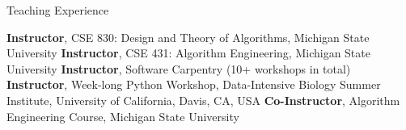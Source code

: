 \begin{rubric}{Teaching Experience}

\entry*[2021] \textbf{Instructor}, CSE 830: Design and Theory of Algorithms, Michigan State University
%
\entry*[2020] \textbf{Instructor}, CSE 431: Algorithm Engineering, Michigan State University
%
\entry*[2015 -- Present] \textbf{Instructor}, Software Carpentry (10+ workshops in total)
%
\entry*[Summer 2017] \textbf{Instructor}, Week-long Python Workshop, Data-Intensive Biology Summer Institute, University of California, Davis, CA, USA
%
\entry*[Spring 2016] \textbf{Co-Instructor}, Algorithm Engineering Course, Michigan State University 
%
\ifshort
\else

%
%
\fi
\end{rubric}